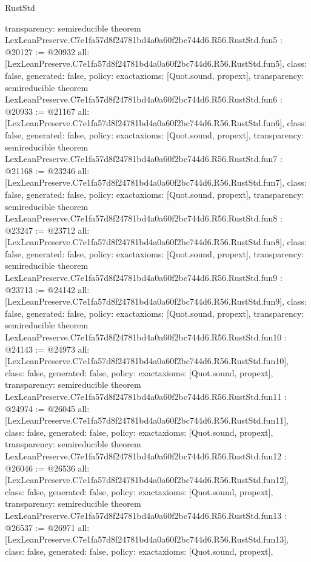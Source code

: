 \begin{lexlean}{RustStd}
\begin{coremodule}
{  transparency: semireducible
}
theorem LexLeanPreserve.C7e1fa57d8f24781bd4a0a60f2bc744d6.R56.RustStd.fun5 : @20127 := @20932 {
  all: [LexLeanPreserve.C7e1fa57d8f24781bd4a0a60f2bc744d6.R56.RustStd.fun5],
  class: false,
  generated: false,
  policy: exact{axioms: [Quot.sound, propext]},
  transparency: semireducible
}
theorem LexLeanPreserve.C7e1fa57d8f24781bd4a0a60f2bc744d6.R56.RustStd.fun6 : @20933 := @21167 {
  all: [LexLeanPreserve.C7e1fa57d8f24781bd4a0a60f2bc744d6.R56.RustStd.fun6],
  class: false,
  generated: false,
  policy: exact{axioms: [Quot.sound, propext]},
  transparency: semireducible
}
theorem LexLeanPreserve.C7e1fa57d8f24781bd4a0a60f2bc744d6.R56.RustStd.fun7 : @21168 := @23246 {
  all: [LexLeanPreserve.C7e1fa57d8f24781bd4a0a60f2bc744d6.R56.RustStd.fun7],
  class: false,
  generated: false,
  policy: exact{axioms: [Quot.sound, propext]},
  transparency: semireducible
}
theorem LexLeanPreserve.C7e1fa57d8f24781bd4a0a60f2bc744d6.R56.RustStd.fun8 : @23247 := @23712 {
  all: [LexLeanPreserve.C7e1fa57d8f24781bd4a0a60f2bc744d6.R56.RustStd.fun8],
  class: false,
  generated: false,
  policy: exact{axioms: [Quot.sound, propext]},
  transparency: semireducible
}
theorem LexLeanPreserve.C7e1fa57d8f24781bd4a0a60f2bc744d6.R56.RustStd.fun9 : @23713 := @24142 {
  all: [LexLeanPreserve.C7e1fa57d8f24781bd4a0a60f2bc744d6.R56.RustStd.fun9],
  class: false,
  generated: false,
  policy: exact{axioms: [Quot.sound, propext]},
  transparency: semireducible
}
theorem LexLeanPreserve.C7e1fa57d8f24781bd4a0a60f2bc744d6.R56.RustStd.fun10 : @24143 := @24973 {
  all: [LexLeanPreserve.C7e1fa57d8f24781bd4a0a60f2bc744d6.R56.RustStd.fun10],
  class: false,
  generated: false,
  policy: exact{axioms: [Quot.sound, propext]},
  transparency: semireducible
}
theorem LexLeanPreserve.C7e1fa57d8f24781bd4a0a60f2bc744d6.R56.RustStd.fun11 : @24974 := @26045 {
  all: [LexLeanPreserve.C7e1fa57d8f24781bd4a0a60f2bc744d6.R56.RustStd.fun11],
  class: false,
  generated: false,
  policy: exact{axioms: [Quot.sound, propext]},
  transparency: semireducible
}
theorem LexLeanPreserve.C7e1fa57d8f24781bd4a0a60f2bc744d6.R56.RustStd.fun12 : @26046 := @26536 {
  all: [LexLeanPreserve.C7e1fa57d8f24781bd4a0a60f2bc744d6.R56.RustStd.fun12],
  class: false,
  generated: false,
  policy: exact{axioms: [Quot.sound, propext]},
  transparency: semireducible
}
theorem LexLeanPreserve.C7e1fa57d8f24781bd4a0a60f2bc744d6.R56.RustStd.fun13 : @26537 := @26971 {
  all: [LexLeanPreserve.C7e1fa57d8f24781bd4a0a60f2bc744d6.R56.RustStd.fun13],
  class: false,
  generated: false,
  policy: exact{axioms: [Quot.sound, propext]},
}
\end{coremodule}
\end{lexlean}
